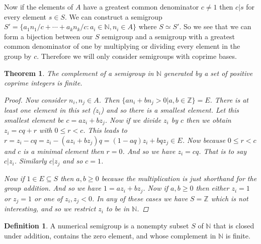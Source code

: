 \documentclass[11pt]{amsart}
\theoremstyle{plain}
\newtheorem{thm}{Theorem}
\theoremstyle{definition}
\newtheorem{defi}{Definition}
\begin{document}
Now if the elements of $A$ have a greatest common denominator $c\ne 1$ then
$c|s$ for every element $s\in S$. We can construct a semigroup $S'=\{a_1n_1/c+
\cdots+{a_k}{n_k}/c:a_i\in \mathbb{N},n_i\in A\}$ where $S\simeq S'$. So we see
that we can form a bijection between our $S$ semigroup and a semigroup with a
greatest common denominator of one by multiplying or dividing every element in
the group by $c$. Therefore we will only consider semigroups with coprime bases.


\begin{thm}
The complement of a semigroup in $\mathbb{N}$ generated by a set of positive
coprime integers is finite.
\begin{proof}
Now consider $n_i,n_j\in A$. Then $\{an_i+bn_j>0|a,b\in \mathbb{Z}\}=E$.
There is at least one element in this set ($z_i$) and so there is a smallest element. Let this smallest element be $c=az_i+bz_j$.
Now if we divide $z_i$ by $c$ then we obtain $z_i=cq+r$ with $0\le r<c$.
This leads to $r=z_i-cq=z_i-(az_i+bz_j)q=(1-aq)z_i+bqz_j\in E$. Now because $0\le r<c$ and $c$ is a minimal element then $r=0$. And so we have $z_i=cq$.
That is to say $c|z_i$. Similarly $c|z_j$ and so $c=1$.

Now if $1\in E\subseteq S$ then $a,b\ge0$ because the multiplication is just shorthand for the group addition. And so we have $1=az_i+bz_j$.
Now if $a,b\ge 0$ then either $z_i=1$ or $z_j=1$ or one of $z_i,z_j<0$. In any of these cases we have $S=\mathbb{Z}$ which is not interesting, and so we restrict $z_i$ to be in $\mathbb{N}$.
\end{proof}
\end{thm}
\begin{defi}\cite{rosales}
  A numerical semigroup is a nonempty subset $S$ of $\mathbb{N}$ that is closed
under addition, contains the zero element, and whose complement in $\mathbb{N}$
is finite.
\end{defi}
\end{document}
